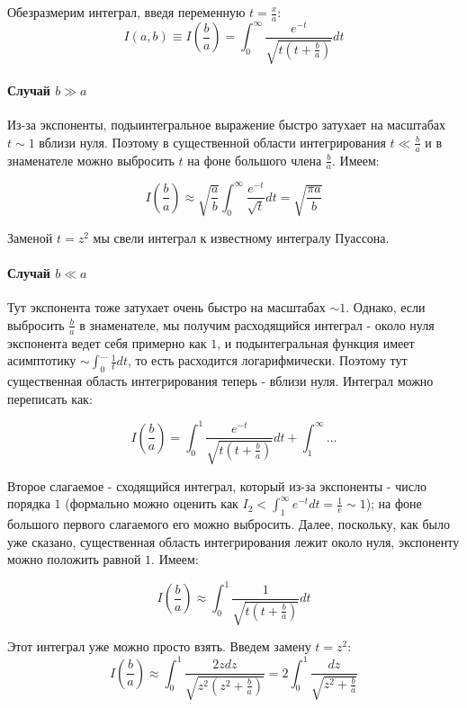 \documentclass[a4paper,12pt]{article}
\begin{document}
Обезразмерим интеграл, введя переменную $t=\frac{x}{a}$:
\[
I(a,b)\equiv I\left(\frac{b}{a}\right)=\int_{0}^{\infty}\frac{e^{-t}}{\sqrt{t\left(t+\frac{b}{a}\right)}}dt
\]



\paragraph{Случай $b\gg a$}

Из-за экспоненты, подыинтегральное выражение быстро затухает на масштабах
$t\sim1$ вблизи нуля. Поэтому в существенной области интегрирования
$t\ll\frac{b}{a}$ и в знаменателе можно выбросить $t$ на фоне большого
члена $\frac{b}{a}$. Имеем:

\[
I\left(\frac{b}{a}\right)\approx\sqrt{\frac{a}{b}}\int_{0}^{\infty}\frac{e^{-t}}{\sqrt{t}}dt = \sqrt{\frac{\pi a}{b}}
\]

\noindent
Заменой $t=z^{2}$ мы свели интеграл к известному интегралу Пуассона.



\paragraph{Случай $b\ll a$}

Тут экспонента тоже затухает очень быстро на масштабах $\sim1$. Однако,
если выбросить $\frac{b}{a}$ в знаменателе, мы получим расходящийся
интеграл - около нуля экспонента ведет себя примерно как $1$, и подынтегральная
функция имеет асимптотику $\sim\int_{0}^{\dots}\frac{1}{t}dt$,
то есть расходится логарифмически. Поэтому тут существенная область
интегрирования теперь - вблизи нуля. Интеграл можно переписать как:

\[
I\left(\frac{b}{a}\right)=\int_{0}^{1}\frac{e^{-t}}{\sqrt{t\left(t+\frac{b}{a}\right)}}dt+\int_{1}^{\infty}\dots
\]

\noindent
Второе слагаемое - сходящийся интеграл, который из-за экспоненты -
число порядка $1$ (формально можно оценить как $I_{2}<\int_{1}^{\infty}e^{-t}dt=\frac{1}{e}\sim1$);
на фоне большого первого слагаемого его можно выбросить. Далее, поскольку,
как было уже сказано, существенная область интегрирования лежит около
нуля, экспоненту можно положить равной $1$. Имеем:

\[
I\left(\frac{b}{a}\right)\approx\int_{0}^{1}\frac{1}{\sqrt{t\left(t+\frac{b}{a}\right)}}dt
\]

\noindent
Этот интеграл уже можно просто взять. Введем замену $t=z^{2}$:
\[
I\left(\frac{b}{a}\right)\approx\int_{0}^{1}\frac{2zdz}{\sqrt{z^{2}\left(z^{2}+\frac{b}{a}\right)}}=2\int_{0}^{1}\frac{dz}{\sqrt{z^{2}+\frac{b}{a}}}
\]
\end{document}
